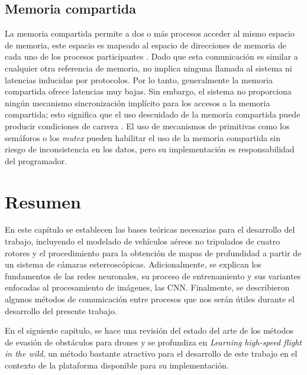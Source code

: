 \subsection*{Memoria compartida}

La memoria compartida permite a dos o más procesos acceder al mismo espacio de memoria, este espacio es mapeado al espacio de direcciones de memoria de cada uno de los procesos participantes \cite{IPCEval2015}. Dado que esta comunicación es similar a cualquier otra referencia de memoria, no implica ninguna llamada al sistema ni latencias inducidas por protocolos. Por lo tanto, generalmente la memoria compartida ofrece latencias muy bajas. Sin embargo, el sistema no proporciona ningún mecanismo sincronización implícito para los accesos a la memoria compartida; esto significa que el uso descuidado de la memoria compartida puede producir condiciones de carrera \cite{IPCEval2015}. El uso de mecanismos de primitivas como los semáforos o los \textit{mutex} pueden habilitar el uso de la memoria compartida sin riesgo de inconsistencia en los datos, pero su implementación es responsabilidad del programador.

\section{Resumen}

En este capítulo se establecen las bases teóricas necesarias para el desarrollo del trabajo, incluyendo el modelado de vehículos aéreos no tripulados de cuatro rotores y el procedimiento para la obtención de mapas de profundidad a partir de un sistema de cámaras estereoscópicas. Adicionalmente, se explican los fundamentos de las redes neuronales, su proceso de entrenamiento y sus variantes enfocadas al procesamiento de imágenes, las CNN. Finalmente, se describieron algunos métodos de comunicación entre procesos que nos serán útiles durante el desarrollo del presente trabajo.

En el siguiente capítulo, se hace una revisión del estado del arte de los métodos de evasión de obstáculos para drones y se profundiza en \textit{Learning high-speed flight in the wild}, un método bastante atractivo para el desarrollo de este trabajo en el contexto de la plataforma disponible para su implementación.
